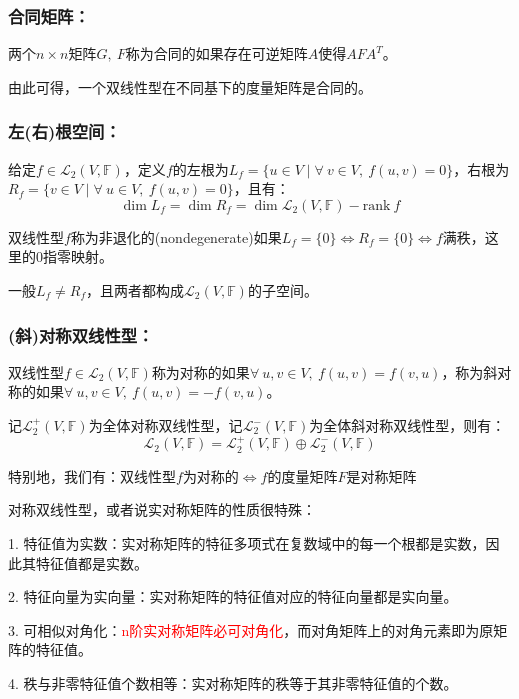 \documentclass[zihao=5,UTF8]{report}
\theoremstyle{mystyle} %
\begin{document}
\subsubsection{合同矩阵：}
两个$n\times n $矩阵$G,\ F$称为合同的如果存在可逆矩阵$A$使得$AFA^T$。\par{\color{gray}\small 由此可得，一个双线性型在不同基下的度量矩阵是合同的。}

\subsubsection{左(右)根空间：}
给定$f \in \mathcal{L}_2(V,\mathbb{F})$，定义$f$的左根为$L_f = \{u \in V \mid \forall\ v \in V,\ f(u,v) = 0\}$，右根为$R_f = \{v \in V \mid \forall\ u \in V,\ f(u,v) = 0\}$，且有：
\begin{equation*}
    \dim L_f = \dim R_f = \dim \mathcal{L}_2(V,\mathbb{F}) - \text{rank}\ f
\end{equation*}\par
双线性型$f$称为非退化的(nondegenerate)如果$L_f = \{0\} \Longleftrightarrow R_f = \{0\} \Longleftrightarrow f\text{满秩}$，这里的0指零映射。\par
{\color{gray}\small  一般$L_f \ne R_f$，且两者都构成$ \mathcal{L}_2(V,\mathbb{F})$的子空间。}

\subsubsection{(斜)对称双线性型：}
双线性型$f\in \mathcal{L}_2(V,\mathbb{F})$称为对称的如果$\forall\  u,v \in V,\ f(u,v) = f(v,u)$，称为斜对称的如果$\forall\  u,v \in V,\ f(u,v) = -f(v,u)$。\par 
记$\mathcal{L}_2^+(V,\mathbb{F})$为全体对称双线性型，记$\mathcal{L}_2^-(V,\mathbb{F})$为全体斜对称双线性型，则有：
\begin{equation*}
    \mathcal{L}_2(V,\mathbb{F}) = \mathcal{L}_2^+(V,\mathbb{F}) \oplus \mathcal{L}_2^-(V,\mathbb{F})
\end{equation*}\par
特别地，我们有：双线性型$f$为对称的$\Longleftrightarrow  f$的度量矩阵$F$是对称矩阵
{\par\color{gray}\small
对称双线性型，或者说实对称矩阵的性质很特殊：\par
1. 特征值为实数：实对称矩阵的特征多项式在复数域中的每一个根都是实数，因此其特征值都是实数。
\par2. 特征向量为实向量：实对称矩阵的特征值对应的特征向量都是实向量。\par
3. 可相似对角化：\textcolor{red}{n阶实对称矩阵必可对角化}，而对角矩阵上的对角元素即为原矩阵的特征值。\par
4. 秩与非零特征值个数相等：实对称矩阵的秩等于其非零特征值的个数。
\par}
\end{document}
